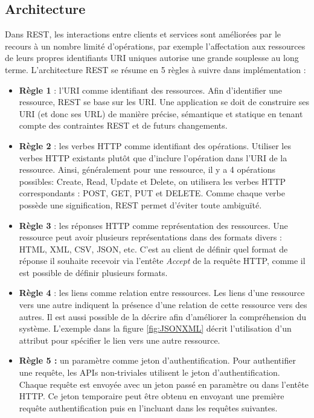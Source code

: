 \subsection{Architecture}
Dans REST, les interactions entre clients et services sont améliorées par le recours à un nombre limité d'opérations, par exemple l'affectation aux ressources de leurs propres identifiants URI uniques autorise une grande souplesse au long terme. 
L'architecture REST se résume en 5 règles à suivre dans implémentation \cite{refRegles} :
\begin{itemize}
	\item \textbf{Règle 1} : l'URI comme identifiant des ressources.\newline
	      Afin d'identifier une ressource, REST se base sur les URI. Une application se doit de construire ses URI (et donc ses URL) de manière précise, sémantique et statique en tenant compte des contraintes REST et de futurs changements.
	\item \textbf{Règle 2} : les verbes HTTP comme identifiant des opérations.\newline
	      Utiliser les verbes HTTP existants plutôt que d'inclure l'opération dans l'URI de la ressource. Ainsi, généralement pour une ressource, il y a 4 opérations possibles: Create, Read, Update et Delete, on utilisera les verbes HTTP correspondants : POST, GET, PUT et DELETE.
	      Comme chaque verbe possède une signification, REST permet d'éviter toute ambiguïté.
	\item \textbf{Règle 3} : les réponses HTTP comme représentation des ressources.\newline
	      Une ressource peut avoir plusieurs représentations dans des formats divers : HTML, XML, CSV, JSON, etc. C'est au client de définir quel format de réponse il souhaite recevoir via l'entête \emph{Accept} de la requête HTTP, comme il est possible de définir plusieurs formats.
	\item \textbf{Règle 4} : les liens comme relation entre ressources.\newline
	Les liens d'une ressource vers une autre indiquent la présence d'une relation de cette ressource vers des autres. Il est aussi possible de la décrire afin d'améliorer la compréhension du système.
	L'exemple dans la figure \ref{fig:JSONXML} décrit l'utilisation d'un attribut pour spécifier le lien vers une autre ressource.
	
	\item \textbf{Règle 5 :} un paramètre comme jeton d'authentification.\newline
	      Pour authentifier une requête, les APIs non-triviales utilisent le jeton d'authentification. Chaque requête est envoyée avec un jeton passé en paramètre ou dans l'entête HTTP. Ce jeton temporaire peut être obtenu en envoyant une première requête authentification puis en l'incluant dans les requêtes suivantes.
\end{itemize}
